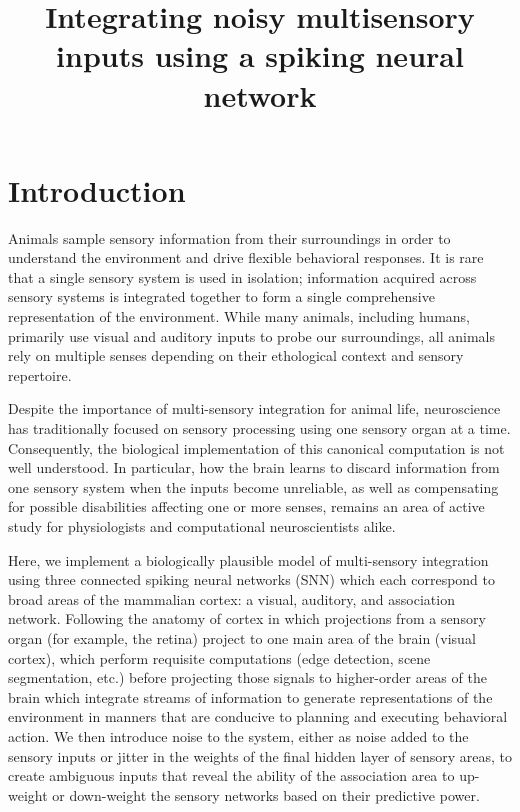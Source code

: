 \documentclass[conference]{IEEEtran}
\begin{document}
\title{
Integrating noisy multisensory inputs using a spiking neural network}

\author{
\and
{}
\and
{}
}

\maketitle



\section{Introduction}
Animals sample sensory information from their surroundings in order to understand the environment and drive flexible behavioral responses. It is rare that a single sensory system is used in isolation; information acquired across sensory systems is integrated together to form a single comprehensive representation of the environment. While many animals, including humans, primarily use visual and auditory inputs to probe our surroundings, all animals rely on multiple senses depending on their ethological context and sensory repertoire.

Despite the importance of multi-sensory integration for animal life, neuroscience has traditionally focused on sensory processing using one sensory organ at a time. Consequently, the biological implementation of this canonical computation is not well understood. In particular, how the brain learns to discard information from one sensory system when the inputs become unreliable, as well as compensating for possible disabilities affecting one or more senses,  remains an area of active study for physiologists and computational neuroscientists alike.

Here, we implement a biologically plausible model of multi-sensory integration using three connected spiking neural networks (SNN) which each correspond to broad areas of the mammalian cortex: a visual, auditory, and association network. Following the anatomy of cortex in which projections from a sensory organ (for example, the retina) project to one main area of the brain (visual cortex), which perform requisite computations (edge detection, scene segmentation, etc.) before projecting those signals to higher-order areas of the brain which integrate streams of information to generate representations of the environment in manners that are conducive to planning and executing behavioral action. We then introduce noise to the system, either as noise added to the sensory inputs or jitter in the weights of the final hidden layer of sensory areas, to create ambiguous inputs that reveal the ability of the association area to up-weight or down-weight the sensory networks based on their predictive power. 
\end{document}

